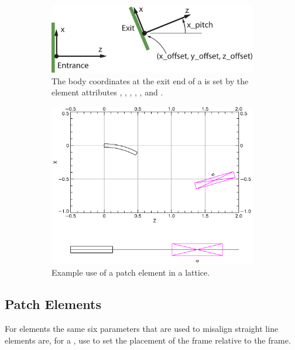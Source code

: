 \documentclass{hitec}
\begin{document}
\begin{figure}[tb]
  \centering
  \begin{subfigure}[b]{0.48\textwidth}
    \includegraphics[width=\textwidth]{patch.pdf}
    \caption{The body coordinates at the exit end of a  is set by the element attributes
, , , , , and .}
    \label{f:patch}
  \end{subfigure}
  \hfil
  \begin{subfigure}[b]{0.48\textwidth}
    \includegraphics[width=\textwidth]{patch-example.pdf}
    \caption{Example use of a patch element in a lattice.}
    \label{f:patch.example}
  \end{subfigure}
  \caption{}
\end{figure}

\subsection{Patch Elements}

For  elements the same six parameters that are used to misalign straight line elements
are, for a , use to set the placement of the  frame relative to the 
frame.
\end{document}
